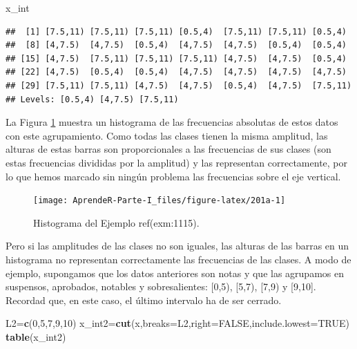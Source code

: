 \documentclass[]{book}
\newenvironment{Shaded}{\begin{snugshade}}{\end{snugshade}}
\newcommand{\DataTypeTok}[1]{\textcolor[rgb]{0.13,0.29,0.53}{#1}}
\newcommand{\DecValTok}[1]{\textcolor[rgb]{0.00,0.00,0.81}{#1}}
\newcommand{\KeywordTok}[1]{\textcolor[rgb]{0.13,0.29,0.53}{\textbf{#1}}}
\newcommand{\NormalTok}[1]{#1}
\newcommand{\OtherTok}[1]{\textcolor[rgb]{0.56,0.35,0.01}{#1}}
\theoremstyle{definition}
\theoremstyle{definition}
\theoremstyle{definition}
\theoremstyle{remark}
\begin{document}
\begin{Shaded}
\begin{Highlighting}[]
\NormalTok{x_int}
\end{Highlighting}
\end{Shaded}

\begin{verbatim}
##  [1] [7.5,11) [7.5,11) [7.5,11) [0.5,4)  [7.5,11) [7.5,11) [0.5,4) 
##  [8] [4,7.5)  [4,7.5)  [0.5,4)  [4,7.5)  [4,7.5)  [0.5,4)  [0.5,4) 
## [15] [4,7.5)  [7.5,11) [7.5,11) [7.5,11) [4,7.5)  [4,7.5)  [0.5,4) 
## [22] [4,7.5)  [0.5,4)  [0.5,4)  [4,7.5)  [4,7.5)  [4,7.5)  [4,7.5) 
## [29] [7.5,11) [7.5,11) [4,7.5)  [4,7.5)  [0.5,4)  [4,7.5)  [7.5,11)
## Levels: [0.5,4) [4,7.5) [7.5,11)
\end{verbatim}

La Figura \ref{fig:201a} muestra un histograma de las frecuencias absolutas de estos datos con este agrupamiento.
Como todas las clases tienen la misma amplitud, las alturas de estas barras son proporcionales a las frecuencias de sus clases (son estas frecuencias divididas por la amplitud) y las representan correctamente, por lo que hemos marcado sin ningún problema las frecuencias sobre el eje vertical.

\begin{figure}

{\centering \texttt{[image: AprendeR-Parte-I\_files/figure-latex/201a-1]} 

}

\caption{Histograma del Ejemplo ref(exm:1115).}\label{fig:201a}
\end{figure}

Pero si las amplitudes de las clases no son iguales, las alturas de las barras en un histograma no representan correctamente las frecuencias de las clases. A modo de ejemplo, supongamos que los datos anteriores son notas y que las agrupamos en suspensos, aprobados, notables y sobresalientes: {[}0,5), {[}5,7), {[}7,9) y {[}9,10{]}. Recordad que, en este caso, el último intervalo ha de ser cerrado.

\begin{Shaded}
\begin{Highlighting}[]
\NormalTok{L2=}\KeywordTok{c}\NormalTok{(}\DecValTok{0}\NormalTok{,}\DecValTok{5}\NormalTok{,}\DecValTok{7}\NormalTok{,}\DecValTok{9}\NormalTok{,}\DecValTok{10}\NormalTok{)}
\NormalTok{x_int2=}\KeywordTok{cut}\NormalTok{(x,}\DataTypeTok{breaks=}\NormalTok{L2,}\DataTypeTok{right=}\OtherTok{FALSE}\NormalTok{,}\DataTypeTok{include.lowest=}\OtherTok{TRUE}\NormalTok{) }
\KeywordTok{table}\NormalTok{(x_int2)}
\end{Highlighting}
\end{Shaded}
\end{document}
